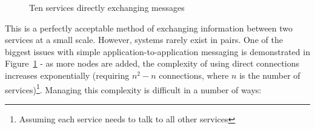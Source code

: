 \begin{figure}[htbp]
  \centering
  
  \caption{Ten services directly exchanging messages}
  \label{fig:tikz:complexDirectMessaging}
\end{figure}

This is a perfectly acceptable method of exchanging information between two
services at a small scale. However, systems rarely exist in pairs. One of the
biggest issues with simple application-to-application messaging is demonstrated
in Figure~\ref{fig:tikz:complexDirectMessaging} - as more nodes are added, the
complexity of using direct connections increases exponentially (requiring $n^2 -
n$ connections, where $n$ is the number of services)\footnote{Assuming each
service needs to talk to all other services}. Managing this complexity is
difficult in a number of ways:

